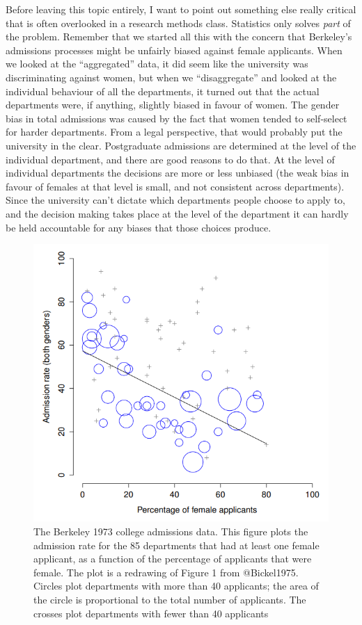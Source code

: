 \documentclass[
]{book}
\begin{document}
Before leaving this topic entirely, I want to point out something else really critical that is often overlooked in a research methods class. Statistics only solves \emph{part} of the problem. Remember that we started all this with the concern that Berkeley's admissions processes might be unfairly biased against female applicants. When we looked at the ``aggregated'' data, it did seem like the university was discriminating against women, but when we ``disaggregate'' and looked at the individual behaviour of all the departments, it turned out that the actual departments were, if anything, slightly biased in favour of women. The gender bias in total admissions was caused by the fact that women tended to self-select for harder departments. From a legal perspective, that would probably put the university in the clear. Postgraduate admissions are determined at the level of the individual department, and there are good reasons to do that. At the level of individual departments the decisions are more or less unbiased (the weak bias in favour of females at that level is small, and not consistent across departments). Since the university can't dictate which departments people choose to apply to, and the decision making takes place at the level of the department it can hardly be held accountable for any biases that those choices produce.

\begin{figure}
\includegraphics[width=0.9\linewidth]{images/Figure1} \caption{The Berkeley 1973 college admissions data. This figure plots the admission rate for the 85 departments that had at least one female applicant, as a function of the percentage of applicants that were female. The plot is a redrawing of Figure 1 from @Bickel1975. Circles plot departments with more than 40 applicants; the area of the circle is proportional to the total number of applicants. The crosses plot departments with fewer than 40 applicants}\label{fig:fig1-1}
\end{figure}
\end{document}
